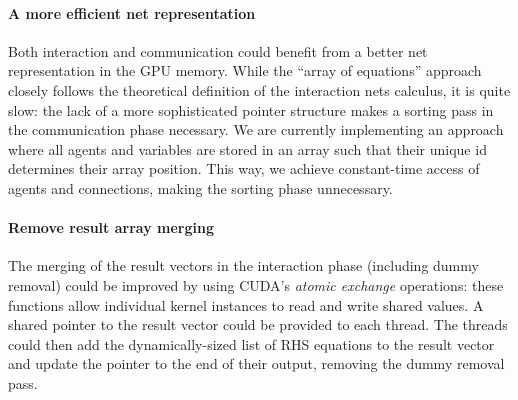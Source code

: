 \documentclass[submission,copyright,creativecommons]{eptcs}
\begin{document}
\paragraph{\textbf{A more efficient net representation}}
Both interaction and communication could benefit from a better net
representation in the GPU memory. While the ``array of equations'' approach
closely follows the theoretical definition of the interaction nets calculus, it
is quite slow: the lack of a more sophisticated pointer structure makes a
sorting pass in the communication phase necessary. We are currently
implementing an approach where all agents and variables are stored in an array
such that their unique id determines their array position. This way, we achieve
constant-time access of agents and connections, making the sorting phase
unnecessary.
%

\paragraph{\textbf{Remove result array merging}} The merging of the result
vectors in the interaction phase (including dummy removal) could be improved by
using CUDA's \emph{atomic exchange} operations: these functions allow individual
kernel instances to read and write shared values. A shared pointer to the result
vector could be provided to each thread. The threads could then add the
dynamically-sized list of RHS equations to the result vector and update the
pointer to the end of their output, removing the
dummy removal pass.%
\end{document}
